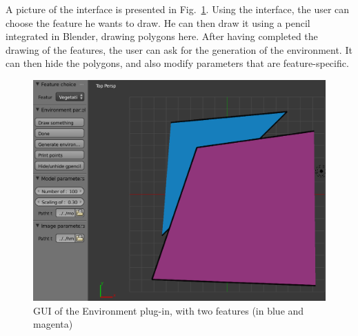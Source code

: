 A picture of the interface is presented in Fig.~\ref{fig:env-gui1}. Using the interface, the user can choose the feature he wants to draw. He can then draw it using a pencil integrated in Blender, drawing polygons here. After having completed the drawing of the features, the user can ask for the generation of the environment. It can then hide the polygons, and also modify parameters that are feature-specific.

\begin{figure}
\includegraphics[width=\textwidth]{img/env_gui1.png}
\caption{GUI of the Environment plug-in, with two features (in blue and magenta)}
\label{fig:env-gui1}
\end{figure}

